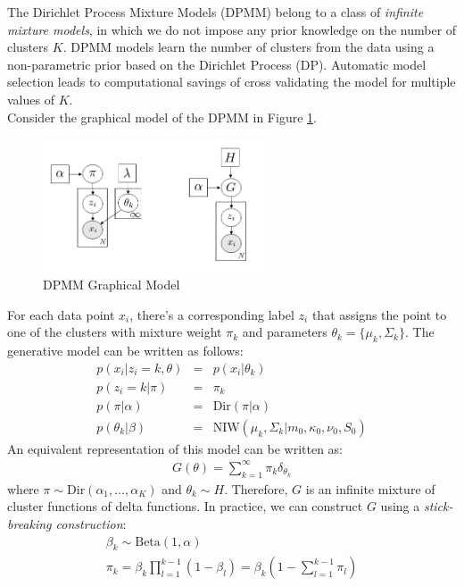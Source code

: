 The Dirichlet Process Mixture Models (DPMM) belong to a class of \textit{infinite mixture models}, in which we do not impose any prior knowledge on the number of clusters $K$. DPMM models learn the number of clusters from the data using a non-parametric prior based on the Dirichlet Process (DP). Automatic model selection leads to computational savings of cross validating the model for multiple values of $K$.\\

Consider the graphical model of the DPMM in Figure \ref{fig:dpmm_gm}.
\begin{figure}[thpb]
    \centering
    \includegraphics[width=0.6\textwidth, trim={10 10 10 10}]{figures/dpmm_gm.png}
    \caption{DPMM Graphical Model}
    \label{fig:dpmm_gm}
\end{figure}
For each data point $x_i$, there's a corresponding label $z_i$ that assigns the point to one of the clusters with mixture weight $\pi_k$ and parameters $\theta_k = \{\mu_k, \Sigma_k\}$. The generative model can be written as follows:
\begin{eqnarray}
    p(x_i|z_i=k,\theta) &=& p(x_i|\theta_k) \\
    p(z_i=k|\pi) &=& \pi_k \\
    p(\pi|\alpha) &=& \mathrm{Dir}(\pi|\alpha) \\
    p(\theta_k|\beta) &=& \mathrm{NIW}(\mu_k,\Sigma_k|m_0,\kappa_0,\nu_0,S_0)
\end{eqnarray}
An equivalent representation of this model can be written as:
\begin{eqnarray}
    G(\theta) = \sum_{k=1}^{\infty}\pi_k \delta_{\theta_k}
\end{eqnarray}
where $\pi \sim \mathrm{Dir}(\alpha_1,...,\alpha_K)$ and $\theta_k \sim H$. Therefore, $G$ is an infinite mixture of cluster functions of delta functions. In practice, we can construct $G$ using a \textit{stick-breaking construction}:
\begin{eqnarray}
    \beta_k \sim \mathrm{Beta}(1,\alpha)\\
    \pi_k = \beta_k \prod_{l=1}^{k-1}(1-\beta_l) = \beta_k(1-\sum_{l=1}^{k-1}\pi_l)
\end{eqnarray}
